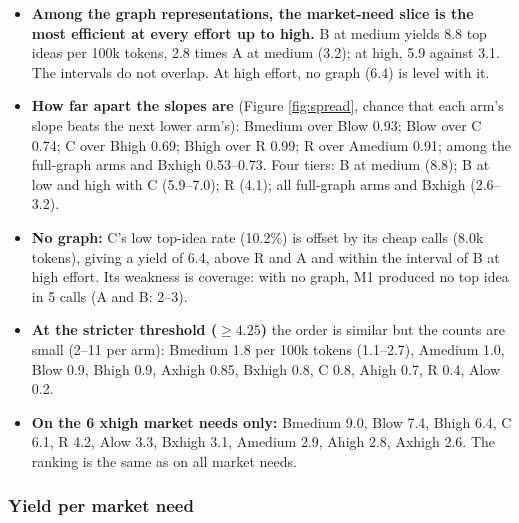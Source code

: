 \begin{itemize}
\tightlist
\item
  \textbf{Among the graph representations, the market-need slice is the most efficient at every effort up to high.} B at medium yields 8.8 top ideas per 100k tokens, 2.8 times A at medium (3.2); at high, 5.9 against 3.1. The intervals do not overlap. At high effort, no graph (6.4) is level with it.
\item
  \textbf{How far apart the slopes are} (Figure \ref{fig:spread}, chance that each arm's slope beats the next lower arm's): B\textperiodcentered{}medium over B\textperiodcentered{}low 0.93; B\textperiodcentered{}low over C 0.74; C over B\textperiodcentered{}high 0.69; B\textperiodcentered{}high over R 0.99; R over A\textperiodcentered{}medium 0.91; among the full-graph arms and B\textperiodcentered{}xhigh 0.53--0.73. Four tiers: B at medium (8.8); B at low and high with C (5.9--7.0); R (4.1); all full-graph arms and B\textperiodcentered{}xhigh (2.6--3.2).
\item
  \textbf{No graph:} C's low top-idea rate (10.2\%) is offset by its cheap calls (8.0k tokens), giving a yield of 6.4, above R and A and within the interval of B at high effort. Its weakness is coverage: with no graph, M1 produced no top idea in 5 calls (A and B: 2--3).
\item
  \textbf{At the stricter threshold ($\ge 4.25$)} the order is similar but the counts are small (2--11 per arm): B\textperiodcentered{}medium 1.8 per 100k tokens (1.1--2.7), A\textperiodcentered{}medium 1.0, B\textperiodcentered{}low 0.9, B\textperiodcentered{}high 0.9, A\textperiodcentered{}xhigh 0.85, B\textperiodcentered{}xhigh 0.8, C 0.8, A\textperiodcentered{}high 0.7, R 0.4, A\textperiodcentered{}low 0.2.
\item
  \textbf{On the 6 xhigh market needs only:} B\textperiodcentered{}medium 9.0, B\textperiodcentered{}low 7.4, B\textperiodcentered{}high 6.4, C 6.1, R 4.2, A\textperiodcentered{}low 3.3, B\textperiodcentered{}xhigh 3.1, A\textperiodcentered{}medium 2.9, A\textperiodcentered{}high 2.8, A\textperiodcentered{}xhigh 2.6. The ranking is the same as on all market needs.
\end{itemize}

\hypertarget{yield-per-market-need}{%
\subsubsection{Yield per market need}\label{yield-per-market-need}}

